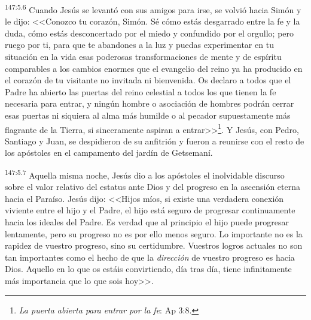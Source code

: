 \par 
\textsuperscript{147:5.6} Cuando Jesús se levantó con sus amigos para irse, se volvió hacia Simón y le dijo: <<Conozco tu corazón, Simón. Sé cómo estás desgarrado entre la fe y la duda, cómo estás desconcertado por el miedo y confundido por el orgullo; pero ruego por ti, para que te abandones a la luz y puedas experimentar en tu situación en la vida esas poderosas transformaciones de mente y de espíritu comparables a los cambios enormes que el evangelio del reino ya ha producido en el corazón de tu visitante no invitada ni bienvenida. Os declaro a todos que el Padre ha abierto las puertas del reino celestial a todos los que tienen la fe necesaria para entrar, y ningún hombre o asociación de hombres podrán cerrar esas puertas ni siquiera al alma más humilde o al pecador supuestamente más flagrante de la Tierra, si sinceramente aspiran a entrar>>\footnote{\textit{La puerta abierta para entrar por la fe}: Ap 3:8.}. Y Jesús, con Pedro, Santiago y Juan, se despidieron de su anfitrión y fueron a reunirse con el resto de los apóstoles en el campamento del jardín de Getsemaní.

\par 
\textsuperscript{147:5.7} Aquella misma noche, Jesús dio a los apóstoles el inolvidable discurso sobre el valor relativo del estatus ante Dios y del progreso en la ascensión eterna hacia el Paraíso. Jesús dijo: <<Hijos míos, si existe una verdadera conexión viviente entre el hijo y el Padre, el hijo está seguro de progresar continuamente hacia los ideales del Padre. Es verdad que al principio el hijo puede progresar lentamente, pero su progreso no es por ello menos seguro. Lo importante no es la rapidez de vuestro progreso, sino su certidumbre. Vuestros logros actuales no son tan importantes como el hecho de que la \textit{dirección} de vuestro progreso es hacia Dios. Aquello en lo que os estáis convirtiendo, día tras día, tiene infinitamente más importancia que lo que sois hoy>>.


